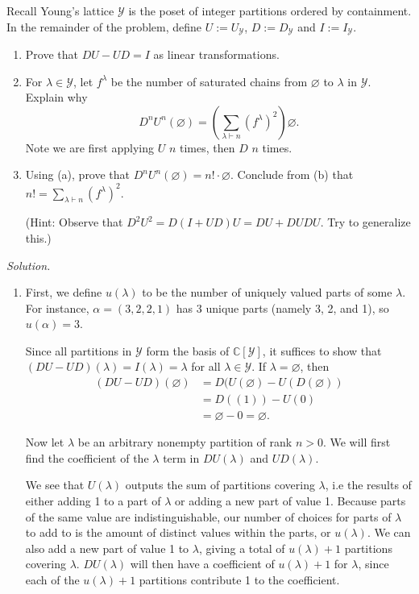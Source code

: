 \documentclass[11pt,letterpaper,dvipsnames]{article}
\newenvironment{solution}{\color{BlueViolet}\textit{Solution.}}{\color{black}}
\begin{document}
\begin{enumerate}
	Recall Young's lattice $\mathcal{Y}$ is the poset of integer partitions ordered by containment.
	In the remainder of the problem, define $U := U_\mathcal{Y}$, $D:= D_\mathcal{Y}$ and $I:= I_\mathcal{Y}$.
	
	\begin{enumerate}
		\item Prove that $DU - UD = I$ as linear transformations.
		\item 
		For $\lambda \in \mathcal{Y}$, let $f^\lambda$ be the number of saturated chains from $\varnothing$ to $\lambda$ in $\mathcal{Y}$.
		Explain why
		\[
		D^nU^n(\varnothing) = \left(\sum_{\lambda \vdash n} (f^\lambda)^2\right) \varnothing.
		\]
		Note we are first applying $U$ $n$ times, then $D$ $n$ times.
		 
		
		\item Using (a), prove that $D^nU^n(\varnothing) = n! \cdot \varnothing$.
		Conclude from (b) that $n! = \sum_{\lambda \vdash n} (f^\lambda)^2$.
		
		(Hint: Observe that $D^2U^2 = D(I + UD)U = DU + DUDU$. Try to generalize this.)
	\end{enumerate}
	
	\begin{solution}
		\begin{enumerate}
			\item 
			First, we define $u(\lambda)$ to be the number of uniquely valued parts of some $\lambda$. For instance, $\alpha =(3,2,2,1)$ has 3 unique parts (namely 3, 2, and 1), so $u(\alpha)=3$. 

			Since all partitions in $\mathcal{Y}$ form the basis of $\mathbb{C}[\mathcal{Y}]$, it suffices to show that $(DU-UD)(\lambda)=I(\lambda)=\lambda$ for all $\lambda \in \mathcal{Y}$. If $\lambda=\varnothing$, then
			\begin{align*}
				(DU-UD)(\varnothing)&=D(U(\varnothing)-U(D(\varnothing)) \\
				&=D((1))-U(0) \\
				&=\varnothing-0=\varnothing.
			\end{align*}
			
			Now let $\lambda$ be an arbitrary nonempty partition of rank $n>0$. We will first find the coefficient of the $\lambda$ term in $DU(\lambda)$ and $UD(\lambda)$.

			We see that $U(\lambda)$ outputs the sum of partitions covering $\lambda$, i.e the results of either adding 1 to a part of $\lambda$ or adding a new part of value 1. 
			Because parts of the same value are indistinguishable, our number of choices for parts of $\lambda$ to add to is the amount of distinct values within the parts, or $u(\lambda)$. We can also add a new part of value 1 to $\lambda$, giving a total of $u(\lambda)+1$ partitions covering $\lambda$. $DU(\lambda)$ will then have a coefficient of $u(\lambda)+1$ for $\lambda$, since each of the $u(\lambda)+1$ partitions contribute 1 to the coefficient.


\end{enumerate}
\end{solution}
\end{enumerate}
\end{document}
